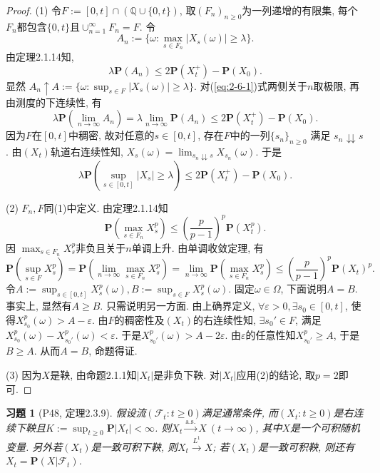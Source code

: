 \documentclass[UTF8,ondside]{ctexart}
\newtheorem{exercise}{习题}[section]
\newcommand{\h}{\mathscr}
\newcommand{\kx}{\mathbb}
\newcommand{\mbf}{\mathbf}
\numberwithin{equation}{section}
\begin{document}
	\begin{proof}
		(1) 令$F:=[0,t]\cap (\kx Q\cup \{0,t\})$, 取$(F_n)_{n\geq 0}$为一列递增的有限集, 每个$F_n$都包含$\{0,t\}$且$\cup_{n=1}^\infty F_n = F$. 令
		\[
			A_n:=\{\omega : \max_{s\in F_n}|X_s(\omega)|\geq \lambda\}.
		\]
		由定理2.1.14知,
		\begin{equation}
			\lambda \mbf P(A_n)\leq 2\mbf P(X_t^+)-\mbf P(X_0).\label{eq:2-6-1}
		\end{equation}
		显然 $A_n\uparrow A:=\{\omega : \sup_{s\in F}|X_s(\omega)|\geq \lambda\}$. 对(\ref{eq:2-6-1})式两侧关于$n$取极限, 再由测度的下连续性, 有
		\[
			\lambda\mbf P\left(\lim_{n\rightarrow\infty}A_n\right)=\lambda \lim_{n\rightarrow\infty}\mbf P(A_n)\leq 2\mbf P(X_t^+)-\mbf P(X_0).
		\]
		因为$F$在$[0,t]$中稠密, 故对任意的$s\in [0,t]$, 存在$F$中的一列$\{s_n\}_{n\geq 0}$ 满足 $s_n\downdownarrows s$. 由$(X_t)$轨道右连续性知, $X_s(\omega)=\lim_{s_n\downdownarrows s}X_{s_n}(\omega)$. 于是
		\[
			\lambda \mbf P\left(\sup_{s\in [0,t]}|X_s|\geq \lambda\right)\leq 2\mbf P(X_t^+)-\mbf P(X_0).
		\]

		(2) $F_n,F$同(1)中定义. 由定理2.1.14知
		\[
			\mbf P\left(\max_{s\in F_n}X_s^p\right)\leq \left(\frac{p}{p-1}\right)^p\mbf P(X_t^p).
		\]
		因 $\max_{s\in F_n} X_s^p$非负且关于$n$单调上升. 由单调收敛定理, 有
		\[
			\mbf P\left(\sup_{s\in F}X_s^p\right)
			=\mbf P\left(\lim_{n\rightarrow\infty}\max_{s\in F_n} X_s^p\right)
			=\lim_{n\rightarrow\infty}\mbf P\left(\max_{s\in F_n}X_s^p\right)
			\leq \left(\frac{p}{p-1}\right)^p\mbf P(X_t)^p.
		\]
		令$A:=\sup_{s\in [0,t]}X_s^p(\omega), B:=\sup_{s\in F}X_s^p(\omega)$. 固定$\omega\in\Omega$, 下面说明$A=B$. 事实上, 显然有$A\geq B$. 只需说明另一方面. 由上确界定义, $\forall \varepsilon > 0, \exists s_0 \in [0,t]$, 使得$X_{s_0}^p(\omega)> A-\varepsilon$. 由$F$的稠密性及$(X_t)$的右连续性知, $\exists s_0'\in F$, 满足$X_{s_0}^p(\omega)-X_{s_0'}^p(\omega)<\varepsilon$. 于是$X_{s_0'}^p(\omega)>A-2\varepsilon$. 由$\varepsilon$的任意性知$X_{s_0'}^p\geq A$, 于是$B\geq A$. 从而$A=B$, 命题得证. 

		(3) 因为$X$是鞅, 由命题2.1.1知$|X_t|$是非负下鞅. 对$|X_t|$应用(2)的结论, 取$p=2$即可.
	\end{proof}
	\begin{exercise}[P48, 定理2.3.9]
		假设流$(\h F_t:t\geq 0)$满足通常条件, 而$(X_t:t\geq 0)$是右连续下鞅且$K:=\sup_{t\geq 0}\mbf P|X_t|<\infty$. 则$X_t\xrightarrow{\text{a.s.}}X\ (t\rightarrow\infty)$, 其中$X$是一个可积随机变量. 另外若$(X_t)$是一致可积下鞅, 则$X_t\xrightarrow{L^1}X$; 若$(X_t)$是一致可积鞅, 则还有$X_t=\mbf P(X|\h F_t)$.
	\end{exercise}
\end{document}

